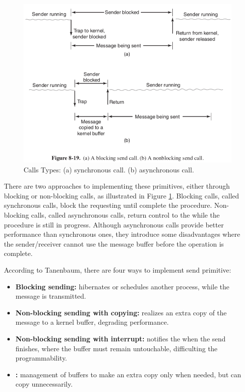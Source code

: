 				\begin{figure}[h]
					\centering
					\includegraphics[width=.8\textwidth]{images/calls-types.png}

					\caption{
						Calls Types:
						(a) synchronous call.
						(b) asynchronous call.
					}\par
					\label{fig.calls-types}
				\end{figure}

				There are two approaches to implementing these primitives, either
				through blocking or non-blocking calls, as illustrated in Figure \ref{fig.calls-types}.
				Blocking calls, called synchronous calls, block the requesting \cpu
				until complete the procedure.
				Non-blocking calls, called asynchronous calls, return control to the
				\cpu while the procedure is still in progress.
				Although asynchronous calls provide better performance than
				synchronous ones, they introduce some disadvantages where the sender/receiver
				cannot use the message buffer before the operation is complete.

				According to Tanenbaum, there are four ways to implement send primitive:
				\begin{itemize}
					\item \textbf{Blocking sending:} \cpu hibernates or schedules another
						process, while the message is transmitted.
					\item \textbf{Non-blocking sending with copying:} realizes an extra copy of
						the message to a kernel buffer, degrading performance.
					\item \textbf{Non-blocking sending with interrupt:} notifies the \cpu
						when the send finishes, where the buffer must remain untouchable,
						difficulting the programmability.
					\item \textbf{\cow:} management of buffers to make an extra copy only
						when needed, but can copy unnecessarily.
				\end{itemize}

